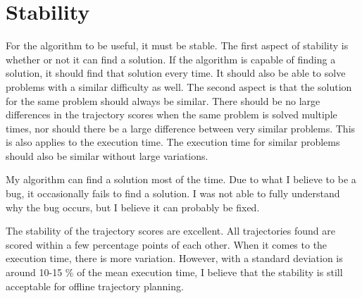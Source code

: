 \section{Stability}
\label{subsec:disc-stab}
For the algorithm to be useful, it must be stable. The first aspect of stability is whether or not it can find a solution. If the algorithm is capable of finding a solution, it should find that solution every time. It should also be able to solve problems with a similar difficulty as well. The second aspect is that the solution for the same problem should always be similar. There should be no large differences in the trajectory scores when the same problem is solved multiple times, nor should there be a large difference between very similar problems. This is also applies to the execution time. The execution time for similar problems should also be similar without large variations.
\par
My algorithm can find a solution most of the time. Due to what I believe to be a bug, it occasionally fails to find a solution. I was not able to fully understand why the bug occurs, but I believe it can probably be fixed.  
\par
The stability of the trajectory scores are excellent. All trajectories found are scored within a few percentage points of each other. When it comes to the execution time, there is more variation. However, with a standard deviation is around 10-15 \% of the mean execution time, I believe that the stability is still acceptable for offline trajectory planning.
%
%
%
